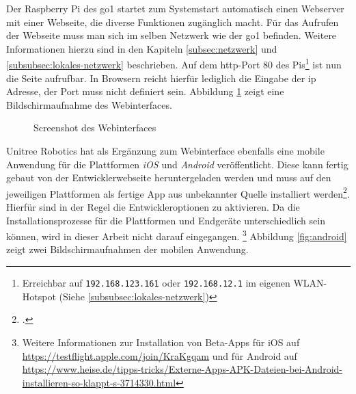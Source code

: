 
Der Raspberry Pi des \gls{go1} startet zum Systemstart automatisch einen Webserver mit einer Webseite, die diverse Funktionen
zugänglich macht.
Für das Aufrufen der Webseite muss man sich im selben Netzwerk wie der \gls{go1} befinden.
Weitere Informationen hierzu sind in den Kapiteln \ref{subsec:netzwerk} und \ref{subsubsec:lokales-netzwerk} beschrieben.
Auf dem \gls{http}-Port \num{80} des Pis\footnote{Erreichbar auf \texttt{192.168.123.161} oder \texttt{192.168.12.1} im eigenen WLAN-Hotspot (Siehe \ref{subsubsec:lokales-netzwerk})}
ist nun die Seite aufrufbar.
In Browsern reicht hierfür lediglich die Eingabe der \gls{ip} Adresse, der Port muss nicht definiert sein.
Abbildung \ref{fig:website} zeigt eine Bildschirmaufnahme des Webinterfaces.

\begin{figure}[h]
    \caption{Screenshot des Webinterfaces}\label{fig:website}
\end{figure}


Unitree Robotics hat als Ergänzung zum Webinterface ebenfalls eine mobile Anwendung für die Plattformen \emph{iOS} und
\emph{Android} veröffentlicht.
Diese kann fertig gebaut von der Entwicklerwebseite heruntergeladen werden und muss auf den jeweiligen Plattformen als
fertige App aus unbekannter Quelle installiert werden\footcite{unitree_app_download}.
Hierfür sind in der Regel die Entwickleroptionen zu aktivieren.
Da die Installationsprozesse für die Plattformen und Endgeräte unterschiedlich sein können, wird in dieser Arbeit nicht
darauf eingegangen.
\footnote{Weitere Informationen zur Installation von Beta-Apps für iOS auf \url{https://testflight.apple.com/join/KraKgqam}
und für Android auf \url{https://www.heise.de/tipps-tricks/Externe-Apps-APK-Dateien-bei-Android-installieren-so-klappt-s-3714330.html}}
Abbildung \ref{fig:android} zeigt zwei Bildschirmaufnahmen der mobilen Anwendung.


